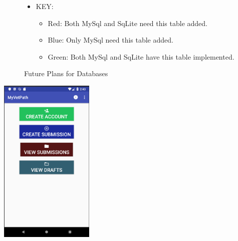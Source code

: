 \documentclass[onecolumn, draftclsnofoot,10pt, compsoc]{IEEEtran}
\begin{document}
\begin{figure}
\begin{itemize}
    \item KEY:
    \begin{itemize}
        \item Red: Both MySql and SqLite need this table added.
        \item Blue: Only MySql need this table added.
        \item Green: Both MySql and SqLite have this table implemented. 
    \end{itemize}
\end{itemize}


\caption{Future Plans for Databases}



\end{figure}


\begin{center}
\includegraphics[height=8cm]{home.png}
\end{center}
\end{document}
